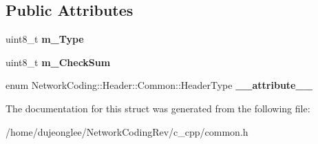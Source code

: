 \subsection*{Public Attributes}
\begin{DoxyCompactItemize}
\item 
uint8\+\_\+t {\bfseries m\+\_\+\+Type}\hypertarget{struct_network_coding_1_1_header_1_1_common_a30fe4c3683ca8bb30e98bf75dfce82f3}{}\label{struct_network_coding_1_1_header_1_1_common_a30fe4c3683ca8bb30e98bf75dfce82f3}

\item 
uint8\+\_\+t {\bfseries m\+\_\+\+Check\+Sum}\hypertarget{struct_network_coding_1_1_header_1_1_common_a6e3b1cc0ffc7a903f9fbe1d44eb06d58}{}\label{struct_network_coding_1_1_header_1_1_common_a6e3b1cc0ffc7a903f9fbe1d44eb06d58}

\item 
enum Network\+Coding\+::\+Header\+::\+Common\+::\+Header\+Type {\bfseries \+\_\+\+\_\+attribute\+\_\+\+\_\+}\hypertarget{struct_network_coding_1_1_header_1_1_common_a6b14dbf617e88e01a0d55c8c60ecee40}{}\label{struct_network_coding_1_1_header_1_1_common_a6b14dbf617e88e01a0d55c8c60ecee40}

\end{DoxyCompactItemize}


The documentation for this struct was generated from the following file\+:\begin{DoxyCompactItemize}
\item 
/home/dujeonglee/\+Network\+Coding\+Rev/c\+\_\+cpp/common.\+h\end{DoxyCompactItemize}
